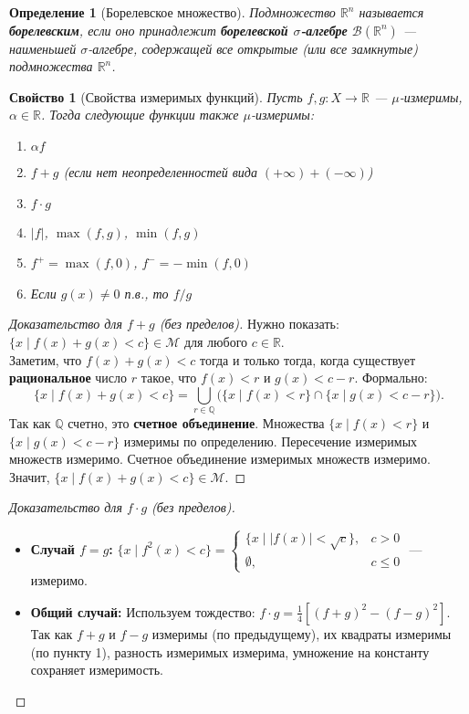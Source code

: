 \documentclass[a4paper, 12pt]{article}
\newtheorem{definition}{Определение}
\newtheorem{property}{Свойство}
\newcommand{\R}{\mathbb{R}}
\newcommand{\Q}{\mathbb{Q}}
\newcommand{\B}{\mathcal{B}}
\newcommand{\1}{\mathbf{1}}
\begin{document}
\begin{definition}[Борелевское множество]
    Подмножество $\R^n$ называется \textbf{борелевским}, если оно принадлежит \textbf{борелевской $\sigma$-алгебре} $\B(\R^n)$ — наименьшей $\sigma$-алгебре, содержащей все открытые (или все замкнутые) подмножества $\R^n$.
\end{definition}

\begin{property}[Свойства измеримых функций]
    Пусть $f, g: X \to \R$ — $\mu$-измеримы, $\alpha \in \R$. Тогда следующие функции также $\mu$-измеримы:
    \begin{enumerate}[label=(\arabic*)]
        \item $\alpha f$
        \item $f + g$ (если нет неопределенностей вида $(+\infty) + (-\infty)$)
        \item $f \cdot g$
        \item $|f|$, $\max(f, g)$, $\min(f, g)$
        \item $f^+ = \max(f, 0)$, $f^- = -\min(f, 0)$
        \item Если $g(x) \neq 0$ п.в., то $f/g$
    \end{enumerate}
\end{property}

\begin{proof}[Доказательство для $f + g$ (без пределов)]
    Нужно показать: $\{x \mid f(x) + g(x) < c\} \in \mathcal{M}$ для любого $c \in \R$. \\
    Заметим, что $f(x) + g(x) < c$ тогда и только тогда, когда существует \textbf{рациональное} число $r$ такое, что $f(x) < r$ и $g(x) < c - r$. Формально:
    \[
    \{x \mid f(x) + g(x) < c\} = \bigcup_{r \in \Q} \Big( \{x \mid f(x) < r\} \cap \{x \mid g(x) < c - r\} \Big).
    \]
    Так как $\Q$ счетно, это \textbf{счетное объединение}. Множества $\{x \mid f(x) < r\}$ и $\{x \mid g(x) < c - r\}$ измеримы по определению. Пересечение измеримых множеств измеримо. Счетное объединение измеримых множеств измеримо. Значит, $\{x \mid f(x) + g(x) < c\} \in \mathcal{M}$.
\end{proof}

\begin{proof}[Доказательство для $f \cdot g$ (без пределов)]
    \hfill
    \begin{itemize}
        \item \textbf{Случай $f = g$:} $\{x \mid f^2(x) < c\} = \begin{cases} 
        \{x \mid |f(x)| < \sqrt{c}\}, & c > 0 \\
        \emptyset, & c \leq 0 
        \end{cases}$ — измеримо.
        \item \textbf{Общий случай:} Используем тождество: $f \cdot g = \frac{1}{4} \left[ (f + g)^2 - (f - g)^2 \right]$. Так как $f + g$ и $f - g$ измеримы (по предыдущему), их квадраты измеримы (по пункту 1), разность измеримых измерима, умножение на константу сохраняет измеримость.
    \end{itemize}
\end{proof}
\end{document}
